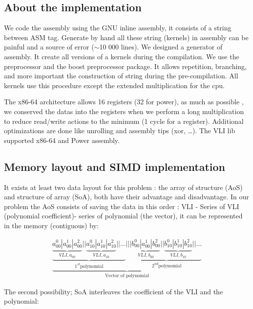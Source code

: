 \documentclass[11pt]{amsart}
\begin{document}
\subsection*{About the implementation}

We code the assembly using the GNU inline assembly, it consists of a string between ASM tag.
Generate by hand all these  string (kernels) in assembly can be painful and a source of error ($\sim$10 000 lines). 
We designed a generator of assembly. It create all versions of a kernels during the compilation.   
We use the preprocessor and the  boost preprocessor package. It allows repetition, branching, and more
 important the construction of string during the pre-compilation.  All kernels use this procedure except the extended multiplication for the cpu.

The x86-64 architecture allows 16 registers (32 for power), as much as possible , we conserved the datas into the registers when we perform a long multiplication to reduce read/write actions to the minimum (1 cycle for a register).
Additional optimizations are done like unrolling and assembly tips (xor,  \dots).  The VLI lib supported  x86-64 and Power assembly.

\subsection*{Memory layout and SIMD implementation}

It exists at least two data layout for this problem : the array of structure (AoS) and structure of array (SoA), both have their advantage and disadvantage. In our problem the AoS consists of saving the data in this order  : VLI - Series of VLI (polynomial coefficient)- series of polynomial (the vector), it can be represented in the memory (contiguous) by:

\begin{eqnarray}
 \underbrace{
 \underbrace{ \underbrace{a^0_{00} | a^1_{00} | a^2_{00}}_{VLI, a_{00} } || \underbrace{a^0_{10} | a^1_{10} | a^2_{10}}_{VLI, a_{10}} ||   \dots  }_{1^{st} \textrm{polynomial}} 
      |||    \underbrace{ \underbrace{b^0_{00} | a^1_{00} | b^2_{00}}_{VLI, b_{00} } || \underbrace{b^0_{10} | b^1_{10} | b^2_{10}}_{VLI, b_{10}} ||   \dots  }_{2^{nd} \textrm{polynomial} } }_{\textrm{Vector of polynomial}} \nonumber
\end{eqnarray}

The second possibility; SoA interleaves the coefficient of the VLI and the polynomial:
\end{document}
